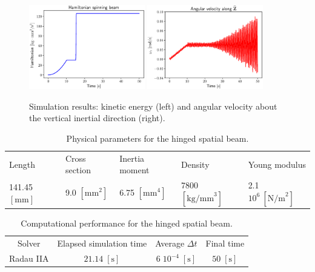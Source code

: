 \documentclass{svjour3}                     %
\newcommand{\secondRev}[1]{\textcolor{blue!80!black}{#1}}
\begin{document}
\begin{figure}[tb]
	\centering
	\includegraphics[width=0.45\textwidth]{H_3Dbeam.eps} 
	\includegraphics[width=0.45\textwidth]{omega_zI.eps} 
	\caption{Simulation results: kinetic energy (left) and angular velocity about the vertical inertial direction (right).}
	\label{fig:H_omega}
\end{figure}

\begin{table}[tb]
	\caption{Physical parameters for the hinged spatial beam.}
	\label{tab:data_3Dbeam}       %
	\begin{tabular}{lllll}
		\hline\noalign{\smallskip}
		Length & Cross section & Inertia moment & Density & Young modulus \\
		\noalign{\smallskip}\hline\noalign{\smallskip}
		141.45 $[\mathrm{mm}]$ & 9.0 $[\mathrm{mm}^2]$ & 6.75 $[\mathrm{mm}^4]$ & 7800 $[\mathrm{kg/mm}^3]$ & 2.1 $10^6 \ [\mathrm{N/m}^2]$  \\
		\hline
	\end{tabular}
\end{table}


\begin{table}[tb]
	\caption{\secondRev{Computational performance for the hinged spatial beam.}}
	\label{tab:comp_perf_hinged}       %
	\begin{tabular}{cccc}
		\hline\noalign{\smallskip}
		Solver & Elapsed simulation time & Average $\Delta t$ &  Final time \\
		\noalign{\smallskip}\hline\noalign{\smallskip}
		Radau IIA & $21.14\; \mathrm{[s]}$ & $6 \; 10^{-4} \; \mathrm{[s]}$ & $50 \; \mathrm{[s]}$ \\
		\hline
	\end{tabular}
\end{table}
\end{document}
